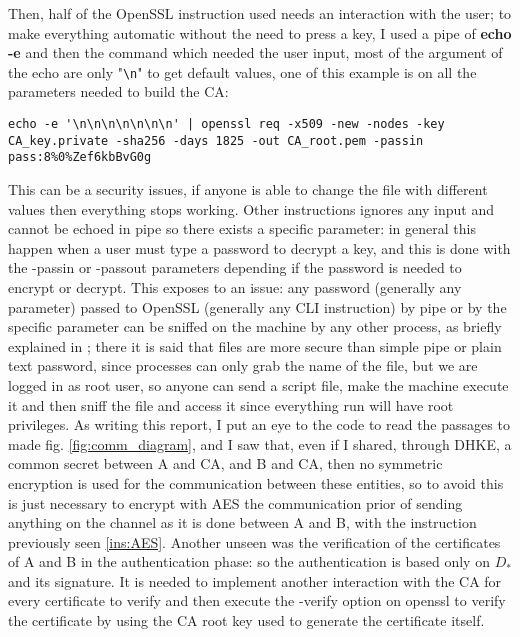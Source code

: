 \documentclass{article}
\begin{document}
Then, half of the OpenSSL instruction used needs an interaction with the user; to make everything automatic without the need to press a key, I used a pipe of \textbf{echo -e} and then the command which needed the user input, most of the argument of the echo are only "\verb|\n|" to get default values, one of this example is on all the parameters needed to build the CA:

\begin{lstlisting}[breaklines]
echo -e '\n\n\n\n\n\n\n' | openssl req -x509 -new -nodes -key CA_key.private -sha256 -days 1825 -out CA_root.pem -passin pass:8%0%Zef6kbBvG0g
\end{lstlisting}

This can be a security issues, if anyone is able to change the file with different values then everything stops working. Other instructions ignores any input and cannot be echoed in pipe so there exists a specific parameter: in general this happen when a user must type a password to decrypt a key, and this is done with the -passin or -passout parameters depending if the password is needed to encrypt or decrypt. This exposes to an issue: any password (generally any parameter) passed to OpenSSL (generally any CLI instruction) by pipe or by the specific parameter can be sniffed on the machine by any other process, as briefly explained in \cite{password}; there it is said that files are more secure than simple pipe or plain text password, since processes can only grab the name of the file, but we are logged in as root user, so anyone can send a script file, make the machine execute it and then sniff the file and access it since everything run will have root privileges.\newline
As writing this report, I put an eye to the code to read the passages to made fig. \ref{fig:comm_diagram}, and I saw that, even if I shared, through DHKE, a common secret between A and CA, and B and CA, then no symmetric encryption is used for the communication between these entities, so to avoid this is just necessary to encrypt with AES the communication prior of sending anything on the channel as it is done between A and B, with the instruction previously seen \ref{ins:AES}.\newline
Another unseen was the verification of the certificates of A and B in the authentication phase: so the authentication is based only on $D_*$ and its signature. It is needed to implement another interaction with the CA for every certificate to verify and then execute the -verify option on openssl to verify the certificate by using the CA root key used to generate the certificate itself.\newline
\end{document}
